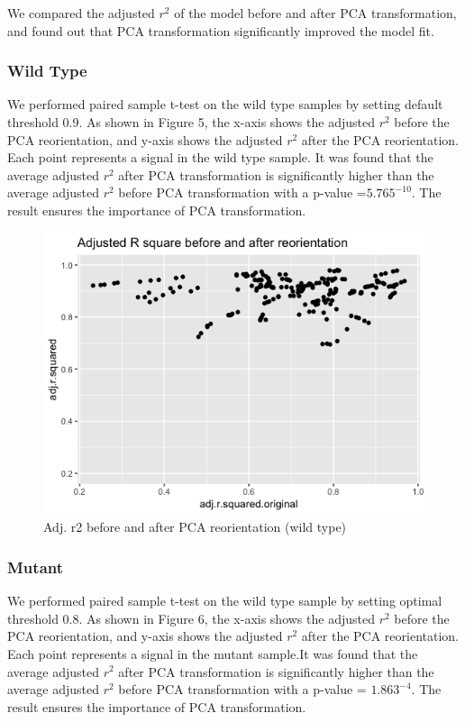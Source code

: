 \documentclass[10pt,letterpaper]{article}
\begin{document}
We compared the adjusted \(r^2\) of the model before and after PCA
transformation, and found out that PCA transformation significantly
improved the model fit.

\subsubsection{Wild Type}\label{wild-type-1}

We performed paired sample t-test on the wild type samples by setting
default threshold 0.9. As shown in Figure 5, the x-axis shows the
adjusted \(r^2\) before the PCA reorientation, and y-axis shows the
adjusted \(r^2\) after the PCA reorientation. Each point represents a
signal in the wild type sample. It was found that the average adjusted
\(r^2\) after PCA transformation is significantly higher than the
average adjusted \(r^2\) before PCA transformation with a p-value
=\(5.765^{-10}\). The result ensures the importance of PCA
transformation.\\

\begin{figure}[H]
\includegraphics[width=0.9\linewidth]{visualization_paper/r2_ro_comparison_wt} \caption{Adj. r2 before and after PCA reorientation (wild type)}\label{fig:Figure5}
\end{figure}

\subsubsection{Mutant}\label{mutant-1}

We performed paired sample t-test on the wild type sample by setting
optimal threshold 0.8. As shown in Figure 6, the x-axis shows the
adjusted \(r^2\) before the PCA reorientation, and y-axis shows the
adjusted \(r^2\) after the PCA reorientation. Each point represents a
signal in the mutant sample.It was found that the average adjusted
\(r^2\) after PCA transformation is significantly higher than the
average adjusted \(r^2\) before PCA transformation with a p-value =
\(1.863^{-4}\). The result ensures the importance of PCA transformation.
\end{document}
